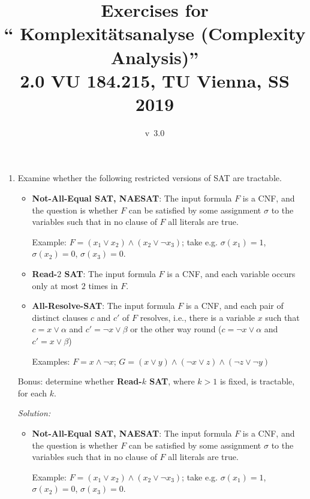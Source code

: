 \documentclass[11pt,a4paper]{article}
\title{\vspace*{-2\baselineskip}Exercises for \\[0.2cm] 
`` Komplexit\"atsanalyse (Complexity Analysis)''\\[0.2cm]
2.0 VU 184.215, TU Vienna, SS 2019}
\date{v~3.0}
\begin{document}

\begin{enumerate}
\item Examine whether the following restricted versions of SAT  are tractable.
  
  \begin{itemize}

  \item {\bf Not-All-Equal SAT, NAESAT}: The input formula $F$ is a
        CNF, and the question is whether $F$ can be satisfied 
        by some assignment $\sigma$ to the variables such that in no clause of $F$ 
        all literals are true.
        
        Example: $F = (x_1 \lor x_2 ) \land (x_2 \lor \neg x_3)$; take e.g. $\sigma(x_1)=1$, $\sigma(x_2)=0$, $\sigma(x_3)=0$.  \\
        
        
\item  {\bf Read-$2$ SAT}: The input formula $F$ is a CNF, and each
        variable occurs only at most $2$ times in $F$.
        

 \item {\bf All-Resolve-SAT}:  The input formula $F$ is a  CNF, and
 each pair of distinct clauses $c$ and $c'$ of $F$ resolves, i.e.,
 there is a variable $x$ such that $c = x \lor \alpha$ and $c' = \neg
 x\lor   \beta$ or the other way round ($c = \neg x \lor \alpha$ and
 $c' = x\lor \beta$)

 Examples:  $F=x\land \neg x$;  $G = (x \lor y) \land (\neg x \lor z)
 \land (\neg z \lor \neg y)$

\end{itemize}

Bonus: determine whether {\bf Read-$k$ SAT}, where $k>1$ is fixed, is
tractable, for each $k$.

\bigskip

\emph{Solution:}

  \begin{itemize}

  \item {\bf Not-All-Equal SAT, NAESAT}: The input formula $F$ is a
        CNF, and the question is whether $F$ can be satisfied 
        by some assignment $\sigma$ to the variables such that in no clause of $F$ 
        all literals are true.
        
        Example: $F = (x_1 \lor x_2 ) \land (x_2 \lor \neg x_3)$; take e.g. $\sigma(x_1)=1$, $\sigma(x_2)=0$, $\sigma(x_3)=0$.  \\
        

\end{itemize}
\end{enumerate}
\end{document}
